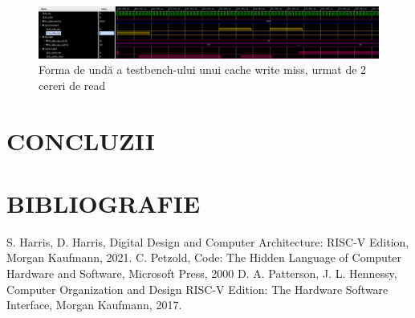 \documentclass[12pt]{article}
\begin{document}
 \begin{figure}[h!]
 \hspace*{-0.5cm}\includegraphics[scale = 0.34]{cachehitmiss.png}
 \centering
 \caption{Forma de undă a testbench-ului unui cache write miss, urmat de 2 cereri de read}
 \label{Figura:74}
 \end{figure}
 
\newpage 
\section{\centering CONCLUZII} 


\newpage 
\section*{\centering BIBLIOGRAFIE}
\begin{thebibliography}{0}
S. Harris, D. Harris, Digital Design and Computer Architecture: RISC-V Edition, Morgan Kaufmann, 2021.
C. Petzold, Code: The Hidden Language of Computer Hardware and Software, Microsoft Press, 2000
D. A. Patterson, J. L. Hennessy, Computer Organization and Design RISC-V Edition: The Hardware Software Interface, Morgan Kaufmann, 2017.

\end{thebibliography}
\end{document}
